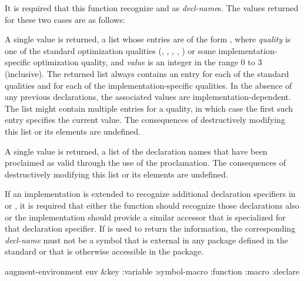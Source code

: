 \begin{newer}
\begin{defun}[Function]
  It is required that this function recognize  and  as
  \emph{decl-name\/}s.  The values returned for these two cases are as follows:
\begin{indentdesc}{7pc}
\item[\cdf{optimize}]
A single value is returned,
a list whose entries are of the form , where
                \emph{quality} is one of the standard optimization qualities
                (, , , , )
                or some implementation-specific optimization quality, and
                \emph{value} is an integer in the range 0 to 3 (inclusive).
                The returned list
                always contains an entry for each of the standard qualities and
                for each of the implementation-specific qualities.  In the
                absence of any previous declarations, the associated values are
                implementation-dependent.  The list might contain multiple
                entries for a quality, in which case the first such entry
                specifies the current value.
                The consequences of destructively modifying this list or
		its elements are undefined.
                

\item[\cdf{declaration}]
A single value is returned,
a list of the declaration names that have been proclaimed as
                valid through the use of the  proclamation.
                The consequences of destructively modifying this list or
		its elements are undefined.
\end{indentdesc}
  If an implementation is extended to recognize additional
  declaration specifiers in  or , it is required that
  either the  function should recognize those
  declarations also or the implementation should provide a similar accessor that is
  specialized for that declaration specifier.  If 
  is used to return the information, the corresponding \emph{decl-name} must not
  be a symbol that is external in any package defined in the standard or
  that is otherwise accessible in the  package.
\end{defun}

\begin{defun}[Function]
augment-environment env &key :variable :symbol-macro :function :macro :declare


\end{defun}
\end{newer}
